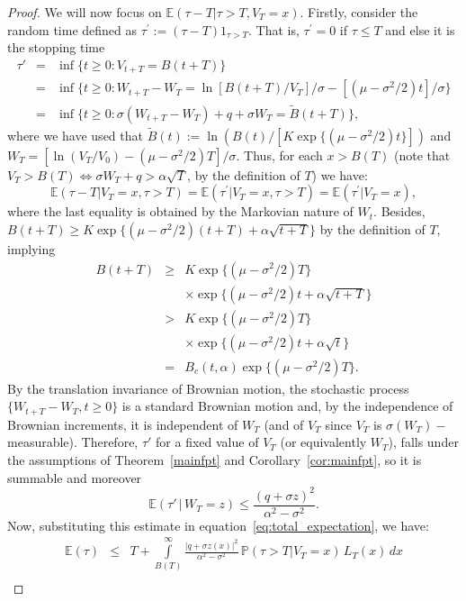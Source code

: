 \documentclass[10pt,a4paper]{amsart}
\begin{document}
\begin{proof}
We will now focus on $\mathbb{E}(\tau-T\vert\tau>T,V_T=x)$. 
Firstly, consider the random time defined as $\tau^\prime:=(\tau-T)1_{\tau>T}$. That is, $\tau^\prime=0$ if $\tau \leq T$ and else it is the stopping time
\begin{eqnarray}\nonumber
\tau' &=& \inf \{ t \ge 0 : V_{t+T}=B(t+T)\}\\ \nonumber
&=&  \inf \{ t \ge 0 : W_{t+T}-W_{T} = \ln[B(t+T)/V_T]/\sigma - \left[(\mu - \sigma^2/2)t \right]/\sigma \}\\ \nonumber
&=&  \inf \{ t \ge 0 : \sigma(W_{t+T}-W_{T})+q+\sigma W_T = \tilde{B}(t+T)\},
\end{eqnarray}
where we have used that $\tilde{B}(t):=\ln\left(B(t)/[K \exp\{(\mu-\sigma^2/2)t\}]\right)$ and $W_T=[\ln(V_T/V_0)-(\mu-\sigma^2/2)T]/\sigma$. Thus, for each $x>B(T)$ (note that $V_T>B(T)\Leftrightarrow \sigma W_T +q> \alpha\sqrt{T}$, by the definition of $T$) we have:
$$
\mathbb{E}(\tau-T\vert V_T=x,\tau>T) =\mathbb{E}(\tau^\prime\vert V_T=x,\tau>T)=\mathbb{E}(\tau^\prime\vert V_T=x),
$$ 
where the last equality is obtained by the Markovian nature of $W_t$. Besides, $B(t+T)\geq K \exp\{(\mu-\sigma^2/2)(t+T)+\alpha\sqrt{t+T}\}$ by the definition of $T$, implying
\begin{eqnarray}\nonumber
B(t+T) &\geq& K \exp\{(\mu-\sigma^2/2)T\} \\ \nonumber
&& \times
\exp\{(\mu-\sigma^2/2)t+\alpha \sqrt{t+T}\} \\ \nonumber
 &>& K \exp\{(\mu-\sigma^2/2)T\} \\ \nonumber
&& \times
\exp\{(\mu-\sigma^2/2)t+\alpha \sqrt{t}\} \\ \nonumber
&=& B_c(t,\alpha) \exp\{(\mu-\sigma^2/2)T\}.
\end{eqnarray}
By the translation invariance of Brownian motion, the stochastic process
$\{W_{t+T}-W_{T},t \ge 0\}$ is a standard Brownian motion and, by the independence of Brownian increments, it is independent of $W_T$ (and of $V_T$ since $V_T$ is $\sigma(W_T)-$measurable). Therefore, $\tau'$ for a fixed value of $V_T$ (or equivalently $W_T$), falls under the assumptions of Theorem~\ref{mainfpt} and Corollary~\ref{cor:mainfpt}, 
so it is summable and moreover
$$
\mathbb{E}(\tau' \, \vert \, W_T=z) \le \frac{(q +\sigma z)^2}{\alpha^2 - \sigma^2}.
$$
Now, substituting this estimate in equation~\eqref{eq:total_expectation}, we have:
\begin{eqnarray}
\label{eq:for_lemma}
\nonumber
\mathbb{E}(\tau) &\le& T + \int\limits_{B(T)}^\infty\frac{|q+\sigma z(x)|^2}{\alpha^2 - \sigma^2} \, \mathbb{P}(\tau>T\vert V_T=x) \, L_T(x) \, dx \\

\end{eqnarray}
\end{proof}
\end{document}
